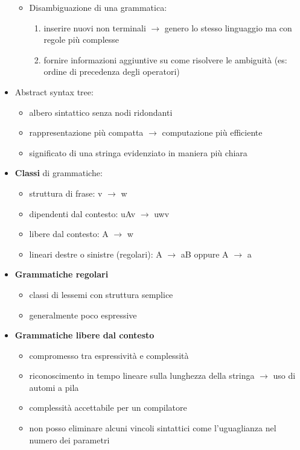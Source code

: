 \documentclass[12pt]{extarticle}
\begin{document}
\begin{itemize}
\begin{itemize}
  \item Disambiguazione di una grammatica:
  \begin{enumerate}
    \item inserire nuovi non terminali $\rightarrow$ genero lo stesso linguaggio ma con regole più complesse
    \item fornire informazioni aggiuntive su come risolvere le ambiguità (es: ordine di precedenza degli operatori)
  \end{enumerate}
  \end{itemize} 
  \item Abstract syntax tree: 
  \begin{itemize}
    \item albero sintattico senza nodi ridondanti
    \item rappresentazione più compatta $\rightarrow$ computazione più efficiente
    \item significato di una stringa evidenziato in maniera più chiara
  \end{itemize}
  \item \textbf{Classi} di grammatiche:
  \begin{itemize}
    \item struttura di frase: v $\rightarrow$ w
    \item dipendenti dal contesto: uAv $\rightarrow$ uwv
    \item libere dal contesto: A $\rightarrow$ w
    \item lineari destre o sinistre (regolari): A $\rightarrow$ aB oppure A $\rightarrow$ a 
  \end{itemize}
  \item \textbf{Grammatiche regolari}
  \begin{itemize}
    \item classi di lessemi con struttura semplice
    \item generalmente poco espressive
  \end{itemize}
  \item \textbf{Grammatiche libere dal contesto}
  \begin{itemize}
    \item compromesso tra espressività e complessità
    \item riconoscimento in tempo lineare sulla lunghezza della stringa $\rightarrow$ uso di automi a pila
    \item complessità accettabile per un compilatore
    \item non posso eliminare alcuni vincoli sintattici come l'uguaglianza nel numero dei parametri
  \end{itemize}
\end{itemize}
\end{document}
